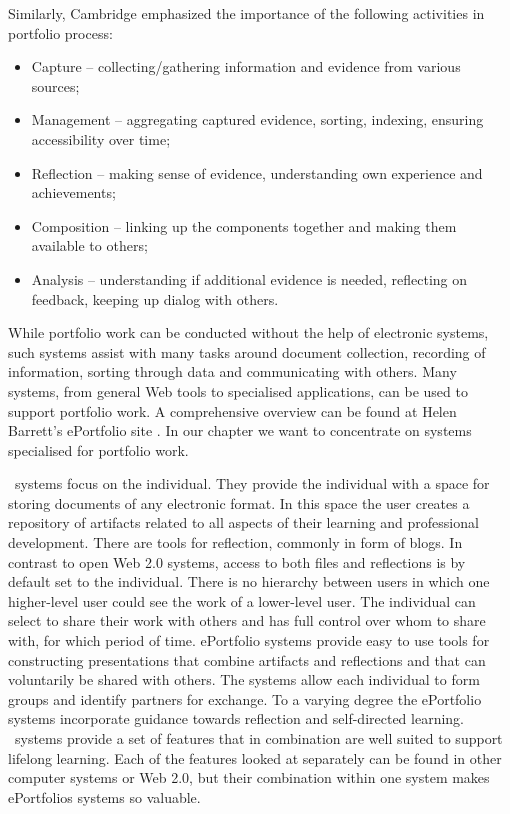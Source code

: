 Similarly, Cambridge \citeyearpar{Cambridge2010} emphasized the importance of
the following activities in portfolio process:

\begin{itemize}
  \item Capture -- collecting/gathering information and evidence from various
  sources;
  \item Management -- aggregating captured evidence, sorting, indexing, ensuring
  accessibility over time;
  \item Reflection -- making sense of evidence, understanding own experience and
  achievements;
  \item Composition -- linking up the components together and making them
  available to others;
  \item Analysis -- understanding if additional evidence is needed, reflecting
  on feedback, keeping up dialog with others.
\end{itemize}

While portfolio work can be conducted without the help of electronic systems,
such systems assist with many tasks around document collection, recording of
information, sorting through data and communicating with others. Many systems,
from general Web tools to specialised applications, can be used to support
portfolio work. A comprehensive overview can be found at Helen Barrett's
ePortfolio site \citep{Barrett2008}. In our chapter we want to concentrate
on systems specialised for portfolio work.

\ep~systems focus on the individual. They provide the individual with a
space for storing documents of any electronic format. In this space the user
creates a repository of artifacts related to all aspects of their learning and
professional development. There are tools for reflection, commonly in form of
blogs. In contrast to open Web 2.0 systems, access to both files and reflections
is by default set to the individual. There is no hierarchy between users in
which one higher-level user could see the work of a lower-level user. The
individual can select to share their work with others and has full control over
whom to share with, for which period of time. ePortfolio systems provide easy to
use tools for constructing presentations that combine artifacts and reflections
and that can voluntarily be shared with others. The systems allow each
individual to form groups and identify partners for exchange. To a varying
degree the ePortfolio systems incorporate guidance towards reflection and
self-directed learning. \ep~systems provide a set of features that in
combination are well suited to support lifelong learning. Each of the features
looked at separately can be found in other computer systems or Web 2.0, but
their combination within one system makes ePortfolios systems so valuable.

